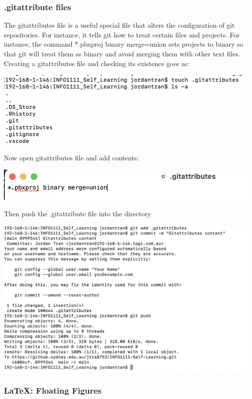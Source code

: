 \documentclass[a4paper, 11pt]{report}
\begin{document}
\subsubsection{.gitattribute files\cite{codepath}}

The gitattributes file is a useful special file that alters the configuration of git repositories. For instance, it tells git how to treat certain files and projects.  For instance, the command *.pbxproj binary merge=union sets projects to binary so that git will treat them as binary and avoid merging them with other text files.  Creating a gitattributes file and checking its existence goes as:

\includegraphics[width=\textwidth]{create_gitattributes}

Now open gitattributes file and add contents:

\includegraphics[width=\textwidth]{gitattributes_contents}

Then push the .gitattribute file into the directory

\includegraphics[width=\textwidth]{add_gitattributes}

\newpage

\subsubsection{LaTeX: Floating Figures\cite{WikiBooks}}
\end{document}
